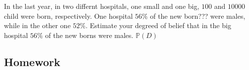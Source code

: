 	\begin{ExerciseList}
		\Exercise In the last year, in two differnt hospitals, one small and one big, $100$ and $10000$ child were born, respectively. One hospital $56\%$ of the new born??? were males, while in the other one $52\%$. Estimate your degreed of belief that in the big hospital $56\%$ of the new borns were males. 
		\Answer
		$\mathbb P(D)$
	\end{ExerciseList}

	\subsection{Homework}
